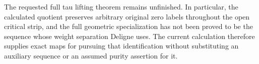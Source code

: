 The requested full tau lifting theorem remains unfinished. In
particular, the calculated quotient preserves arbitrary original zero
labels throughout the open critical strip, and the full geometric
specialization has not been proved to be the sequence whose weight
separation Deligne uses. The current calculation therefore supplies
exact maps for pursuing that identification without substituting an
auxiliary sequence or an assumed purity assertion for it.
